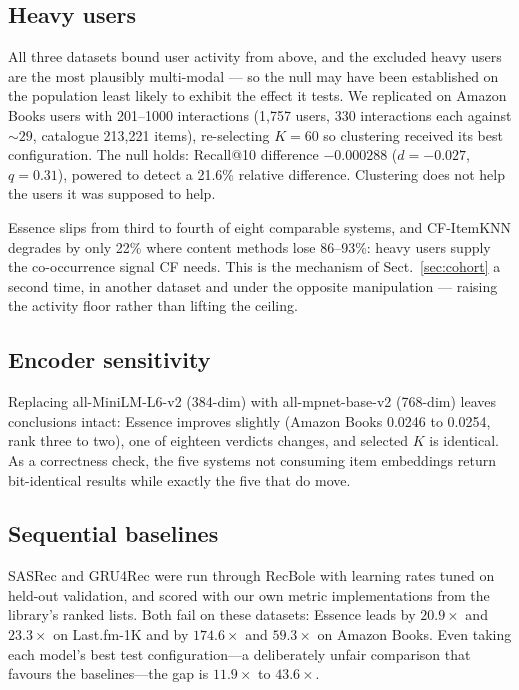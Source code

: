\documentclass[runningheads]{llncs}
\begin{document}
\subsection{Heavy users}\label{sec:heavy}

All three datasets bound user activity from above, and the excluded heavy users are the most
plausibly multi-modal --- so the null may have been established on the population least
likely to exhibit the effect it tests. We replicated on Amazon Books users with 201--1000
interactions (1{,}757 users, 330 interactions each against ${\sim}29$, catalogue 213{,}221
items), re-selecting $K=60$ so clustering received its best configuration. The null holds:
Recall@10 difference $-0.000288$ ($d=-0.027$, $q=0.31$), powered to detect a 21.6\%
relative difference. Clustering does not help the users it was supposed to help.

Essence slips from third to fourth of eight comparable systems, and CF-ItemKNN degrades by
only 22\% where content methods lose 86--93\%: heavy users supply the co-occurrence signal
CF needs. This is the mechanism of Sect.~\ref{sec:cohort} a second time, in another dataset
and under the opposite manipulation --- raising the activity floor rather than lifting the
ceiling.

\subsection{Encoder sensitivity}

Replacing all-MiniLM-L6-v2 (384-dim) with all-mpnet-base-v2 (768-dim) leaves conclusions
intact: Essence improves slightly (Amazon Books 0.0246 to 0.0254, rank three to two), one of
eighteen verdicts changes, and selected $K$ is identical. As a correctness check, the five
systems not consuming item embeddings return bit-identical results while exactly the five
that do move.

\subsection{Sequential baselines}\label{sec:seq}

SASRec and GRU4Rec were run through RecBole with learning rates tuned on held-out
validation, and scored with our own metric implementations from the library's ranked lists.
Both fail on these datasets: Essence leads by $20.9\times$ and $23.3\times$ on Last.fm-1K
and by $174.6\times$ and $59.3\times$ on Amazon Books. Even taking each model's
best test configuration---a deliberately unfair comparison that favours the
baselines---the gap is $11.9\times$ to $43.6\times$.
\end{document}
